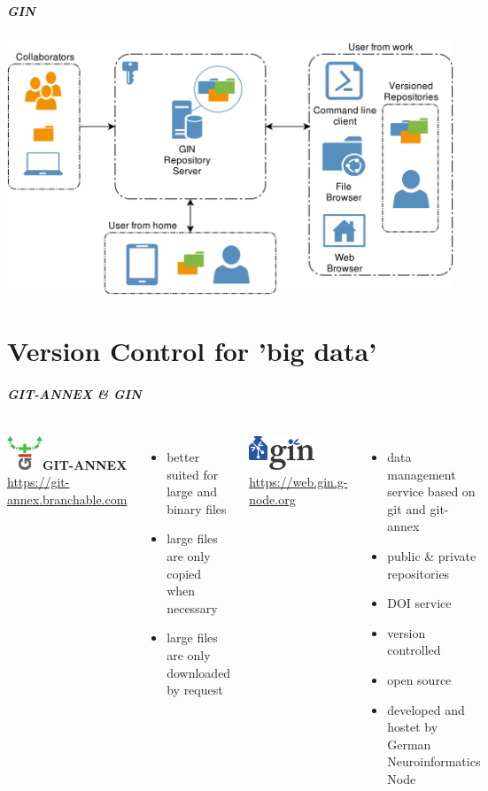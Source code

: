 \documentclass[
t, %
10pt, %
aspectratio=1610, %
ngerman,
english,
]{beamer}
\begin{document}
\begin{frame}
    \frametitle{GIN}
    \centering
    \includegraphics[height=0.7\textheight]{graphics/image9539.png}\\
\end{frame}

\part{Version Control for 'big data'}
\makepart

\begin{frame}
    \frametitle{GIT-ANNEX \& GIN}
    \begin{columns}
	\includegraphics[height=1cm]{graphics/gitannex_logo}\textbf{GIT-ANNEX}\\
	\url{https://git-annex.branchable.com}\\
	\begin{itemize}
	    \item better suited for large and binary files
	    \item large files are only copied when necessary
	    \item large files are only downloaded by request
	\end{itemize}
	\includegraphics[height=1cm]{graphics/GinLogo}\\
	\url{https://web.gin.g-node.org}\\
	\begin{itemize}
	    \item data management service based on git and git-annex
	    \item public \& private repositories
	    \item DOI service
	    \item version controlled
	    \item open source
	    \item developed and hostet by German Neuroinformatics Node
	\end{itemize}
    \end{columns}\\
\end{frame}
\end{document}
